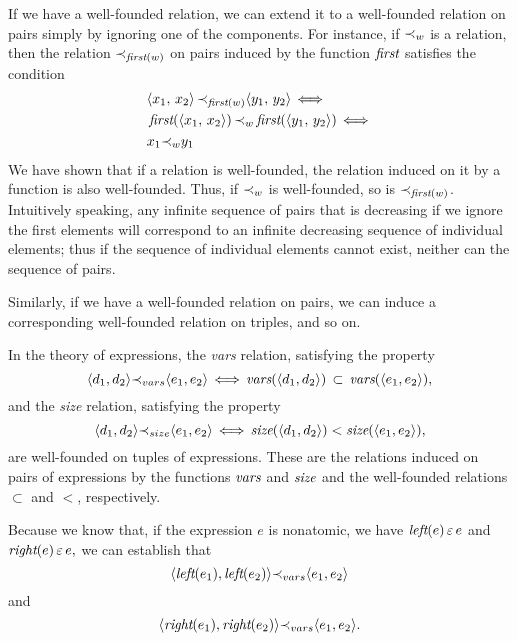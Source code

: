 \documentclass[runningheads]{llncs}
\DeclareMathOperator{\uiff}{\iff}
\DeclareMathOperator{\lef}{\emph{left}}
\DeclareMathOperator{\rig}{\emph{right}}
\DeclareMathOperator{\ufirst}{\emph{first}}
\begin{document}
 
 If we have a well-founded relation, we can extend it to a well-founded relation on pairs simply by ignoring one of the components.  For instance, if ${\prec}_{w}$ is a relation, then the relation $\expsub{\prec}{\ufirst(w)}$ on pairs induced by the function $\ufirst$ satisfies the condition
  \begin{alignat*}{2}
  \begin{split}
 &\langle \varsub{x}{1}, \,  \varsub{x}{2}\rangle \, \expsub{\prec}{\ufirst(w)} 
    \langle \varsub{y}{1}, \,  \varsub{y}{2}\rangle  \uiff \\
  &\ufirst(\langle \varsub{x}{1}, \,  \varsub{x}{2}\rangle) \, \expsub{\prec}{w} 
    \ufirst(\langle \varsub{y}{1}, \,  \varsub{y}{2}\rangle) \uiff \\
  &\varsub{x}{1}\expsub{\prec}{w} 
   \varsub{y}{1}
  \end{split}
\end{alignat*} 
We have shown that if a relation is well-founded, the relation induced on it by a function is also well-founded.  Thus, if ${\prec}_{w}$ is well-founded, so is $\expsub{\prec}{\ufirst(w)}$. Intuitively speaking, any infinite sequence of pairs that is decreasing if we ignore the first elements will correspond to an infinite decreasing sequence of individual elements; thus if the sequence of individual elements cannot exist, neither can the sequence of pairs.

Similarly, if we have a well-founded relation on pairs, we can induce a corresponding well-founded relation on triples, and so on.


In the theory of expressions, the \emph{vars} relation, satisfying the property
 \[ \langle  \expsub{d}{1}, \expsub{d}{2} \rangle   
  \expsub{\prec}{vars} 
      \langle  \expsub{e}{1}, \expsub{e}{2} \rangle
      \uiff \vars(\langle  \expsub{d}{1}, \expsub{d}{2} \rangle ) \, \subset \, \vars(\langle  \expsub{e}{1}, \expsub{e}{2} \rangle),\] 
      and the \emph{size} relation, satisfying the property
      \[ \langle  \expsub{d}{1}, \expsub{d}{2} \rangle   
  \expsub{\prec}{size} 
      \langle  \expsub{e}{1}, \expsub{e}{2} \rangle
      \uiff \size(\langle  \expsub{d}{1}, \expsub{d}{2} \rangle ) < \size(\langle  \expsub{e}{1}, \expsub{e}{2} \rangle),\] 
      are well-founded on tuples of expressions. These are the relations induced on pairs of expressions by the functions $\emph{vars}$ and $\emph{size}$ and the well-founded relations $\subset$ and $<$, respectively.

      Because we know that, if the expression $e$ is nonatomic, we have $\lef(e) \occursin e$ and $\rig(e) \occursin e,$ we can establish that
      \[\langle  \lef(\e{1}), \lef(\e{2}) \rangle \expsub{\prec}{vars} 
      \langle  \e{1}, \e{2} \rangle
      \] 
      and     
      \[\langle  \rig(\e{1}), \rig(\e{2}) \rangle \expsub{\prec}{vars} 
      \langle  \e{1}, \e{2} \rangle. \]
  
\end{document}
